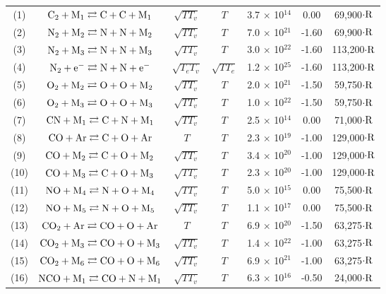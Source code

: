 \documentclass{warpdoc}
\begin{document}
\begin{table}[!h]
\begin{center}
\begin{threeparttable}
\begin{tabular}{ccccccc}
(1) & $\rm C_2 + M_1 \rightleftarrows C + C + M_1$ \tnote{1} & $\sqrt{TT_{v}}$ & $T$ & 3.7 $\times$ 10$^{14}$  & 0.00 & 69,900$\cdot \rm R$ \tnote{7} \\
(2) & $\rm N_2 + M_2 \rightleftarrows N + N + M_2$ \tnote{2} & $\sqrt{TT_{v}}$ & $T$ & 7.0 $\times$ 10$^{21}$  & -1.60 & 69,900$\cdot \rm R$ \\
(3) & $\rm N_2 + M_3 \rightleftarrows N + N + M_3$ \tnote{3} & $\sqrt{TT_{v}}$ & $T$ & 3.0 $\times$ 10$^{22}$  & -1.60 & 113,200$\cdot \rm R$ \\
(4) & $\rm N_2 + e^- \rightleftarrows N + N + e^-$ & $\sqrt{T_{e}T_{v}}$ & $\sqrt{TT_{e}}$ & 1.2 $\times$ 10$^{25}$  & -1.60 & 113,200$\cdot \rm R$ \\
(5) & $\rm O_2 + M_2 \rightleftarrows O + O + M_2$ \tnote{2} & $\sqrt{TT_{v}}$ & $T$ & 2.0 $\times$ 10$^{21}$  & -1.50 & 59,750$\cdot \rm R$ \\
(6) & $\rm O_2 + M_3 \rightleftarrows O + O + M_3$ \tnote{3} & $\sqrt{TT_{v}}$ & $T$ & 1.0 $\times$ 10$^{22}$  & -1.50 & 59,750$\cdot \rm R$ \\
(7) & $\rm CN + M_1 \rightleftarrows C + N + M_1$ \tnote{1} & $\sqrt{TT_{v}}$ & $T$ & 2.5 $\times$ 10$^{14}$  & 0.00 & 71,000$\cdot \rm R$ \\
(8) & $\rm CO + Ar \rightleftarrows C + O + Ar$ & $T$ & $T$ & 2.3 $\times$ 10$^{19}$  & -1.00 & 129,000$\cdot \rm R$ \\
(9) & $\rm CO + M_2 \rightleftarrows C + O + M_2$ \tnote{2} & $\sqrt{TT_{v}}$ & $T$ & 3.4 $\times$ 10$^{20}$  & -1.00 & 129,000$\cdot \rm R$ \\
(10) & $\rm CO + M_3 \rightleftarrows C + O + M_3$ \tnote{3} & $\sqrt{TT_{v}}$ & $T$ & 2.3 $\times$ 10$^{20}$  & -1.00 & 129,000$\cdot \rm R$ \\
(11) & $\rm NO + M_4 \rightleftarrows N + O + M_4$ \tnote{4} & $\sqrt{TT_{v}}$ & $T$ & 5.0 $\times$ 10$^{15}$  & 0.00 & 75,500$\cdot \rm R$ \\
(12) & $\rm NO + M_5 \rightleftarrows N + O + M_5$ \tnote{5} & $\sqrt{TT_{v}}$ & $T$ & 1.1 $\times$ 10$^{17}$  & 0.00 & 75,500$\cdot \rm R$ \\
(13) & $\rm CO_2 + Ar \rightleftarrows CO + O + Ar$ & $T$ & $T$ & 6.9 $\times$ 10$^{20}$  & -1.50 & 63,275$\cdot \rm R$ \\
(14) & $\rm CO_2 + M_3 \rightleftarrows CO + O + M_3$ \tnote{3} & $\sqrt{TT_{v}}$ & $T$ & 1.4 $\times$ 10$^{22}$  & -1.00 & 63,275$\cdot \rm R$ \\
(15) & $\rm CO_2 + M_6 \rightleftarrows CO + O + M_6$ \tnote{6} & $\sqrt{TT_{v}}$ & $T$ & 6.9 $\times$ 10$^{21}$  & -1.00 & 63,275$\cdot \rm R$ \\
(16) & $\rm NCO + M_1 \rightleftarrows CO + N + M_1$ \tnote{1} & $\sqrt{TT_{v}}$ & $T$ & 6.3 $\times$ 10$^{16}$  & -0.50 & 24,000$\cdot \rm R$ \\




\end{tabular}
\end{threeparttable}
\end{center}
\end{table}
\end{document}
